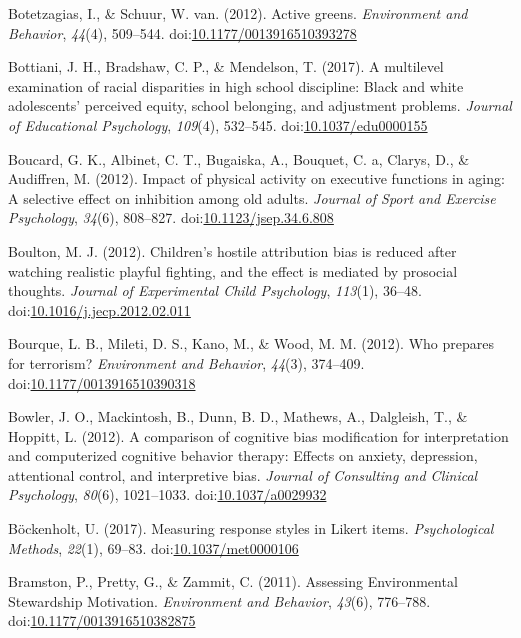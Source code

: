 \documentclass[english,man]{apa6}
\theoremstyle{definition}
\theoremstyle{definition}
\theoremstyle{definition}
\theoremstyle{remark}
\begin{document}
\hypertarget{ref-Botetzagias2012}{}
Botetzagias, I., \& Schuur, W. van. (2012). Active greens.
\emph{Environment and Behavior}, \emph{44}(4), 509--544.
doi:\href{https://doi.org/10.1177/0013916510393278}{10.1177/0013916510393278}

\hypertarget{ref-Bottiani2017}{}
Bottiani, J. H., Bradshaw, C. P., \& Mendelson, T. (2017). A multilevel
examination of racial disparities in high school discipline: Black and
white adolescents' perceived equity, school belonging, and adjustment
problems. \emph{Journal of Educational Psychology}, \emph{109}(4),
532--545.
doi:\href{https://doi.org/10.1037/edu0000155}{10.1037/edu0000155}

\hypertarget{ref-Boucard2012}{}
Boucard, G. K., Albinet, C. T., Bugaiska, A., Bouquet, C. a, Clarys, D.,
\& Audiffren, M. (2012). Impact of physical activity on executive
functions in aging: A selective effect on inhibition among old adults.
\emph{Journal of Sport and Exercise Psychology}, \emph{34}(6), 808--827.
doi:\href{https://doi.org/10.1123/jsep.34.6.808}{10.1123/jsep.34.6.808}

\hypertarget{ref-Boulton2012}{}
Boulton, M. J. (2012). Children's hostile attribution bias is reduced
after watching realistic playful fighting, and the effect is mediated by
prosocial thoughts. \emph{Journal of Experimental Child Psychology},
\emph{113}(1), 36--48.
doi:\href{https://doi.org/10.1016/j.jecp.2012.02.011}{10.1016/j.jecp.2012.02.011}

\hypertarget{ref-Bourque2012}{}
Bourque, L. B., Mileti, D. S., Kano, M., \& Wood, M. M. (2012). Who
prepares for terrorism? \emph{Environment and Behavior}, \emph{44}(3),
374--409.
doi:\href{https://doi.org/10.1177/0013916510390318}{10.1177/0013916510390318}

\hypertarget{ref-Bowler2012}{}
Bowler, J. O., Mackintosh, B., Dunn, B. D., Mathews, A., Dalgleish, T.,
\& Hoppitt, L. (2012). A comparison of cognitive bias modification for
interpretation and computerized cognitive behavior therapy: Effects on
anxiety, depression, attentional control, and interpretive bias.
\emph{Journal of Consulting and Clinical Psychology}, \emph{80}(6),
1021--1033.
doi:\href{https://doi.org/10.1037/a0029932}{10.1037/a0029932}

\hypertarget{ref-Bockenholt2017}{}
Böckenholt, U. (2017). Measuring response styles in Likert items.
\emph{Psychological Methods}, \emph{22}(1), 69--83.
doi:\href{https://doi.org/10.1037/met0000106}{10.1037/met0000106}

\hypertarget{ref-Bramston2011}{}
Bramston, P., Pretty, G., \& Zammit, C. (2011). Assessing Environmental
Stewardship Motivation. \emph{Environment and Behavior}, \emph{43}(6),
776--788.
doi:\href{https://doi.org/10.1177/0013916510382875}{10.1177/0013916510382875}
\end{document}
